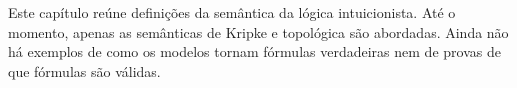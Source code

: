 \documentclass[../../../include/open-logic-chapter]{subfiles}
\begin{document}

\begin{editorial}
  Este capítulo reúne definições da semântica da lógica intuicionista.
  Até o momento, apenas as semânticas de Kripke e topológica são
  abordadas. Ainda não há exemplos de como os modelos tornam fórmulas
  verdadeiras nem de provas de que fórmulas são válidas.
\end{editorial}


\OLEndChapterHook
\end{document}
